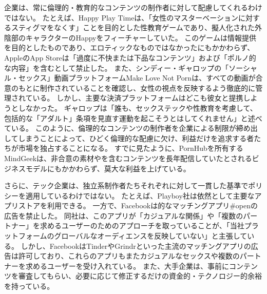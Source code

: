 \documentclass[paper=a4,book,openany]{jlreq}
\begin{document}
企業は、常に倫理的・教育的なコンテンツの制作者に対して配慮してくれるわけではない。
たとえば、Happy Play Timeは、「女性のマスターベーションに対するスティグマをなくす」ことを目的とした性教育ゲームであり、擬人化された外陰部のキャラクターのHappyをフィーチャーしていた。
このゲームは情報提供を目的としたものであり、エロティックなものではなかったにもかかわらず、AppleのApp Storeは「過度に不快または下品なコンテンツ」および「ポルノ的な内容」を含むとして禁止した\citep{dhapolamay14:_apples_rejec_happy_playt_app}。
また、シンディー・ギャロップの「ソーシャル・セックス」動画プラットフォームMake Love Not Pornは、すべての動画が合意のもとに制作されていることを確認し、女性の視点を反映するよう徹底的に管理されている。
しかし、主要な決済プラットフォームはどこも彼女と提携しようとしなかった。
ギャロップは「誰も、セックステックや性教育を考慮して、包括的な「アダルト」条項を見直す運動を起こそうとはしてくれません」と述べている\citep{deighton20:_why_sex_start_face_uphil_paymen_battl}。
このように、倫理的なコンテンツの制作者を企業による制限が締め出してしまうことによって、ひどく倫理的な配慮に欠け、利益だけを追求する者たちが市場を独占することになる。
すでに見たように、PornHubを所有するMindGeekは、非合意の素材やを含むコンテンツを長年配信していたとされるビジネスモデルにもかかわらず、莫大な利益を上げている。

さらに、テック企業は、独立系制作者たちそれぞれに対して一貫した基準でポリシーを適用しているわけではない。
たとえば、Playboy社は依然として主要なアプリストアを利用できる。
一方で、Facebookは的なマッチングアプリ\#openの広告を禁止した。
同社は、このアプリが「カジュアルな関係」や「複数のパートナー」を求めるユーザーのためのアプローチを取っていることが、「当社プラットフォームのグローバルなオーディエンスを反映していない」と主張している\citep{kibbe20:_faceb_has_banned_ads_kink}。
しかし、FacebookはTinderやGrindrといった主流のマッチングアプリの広告は許可しており、これらのアプリもまたカジュアルなセックスや複数のパートナーを求めるユーザーを受け入れている。
また、大手企業は、事前にコンテンツを審査してもらい、必要に応じて修正するだけの資金的・テクノロジー的余裕を持っている。
\end{document}
